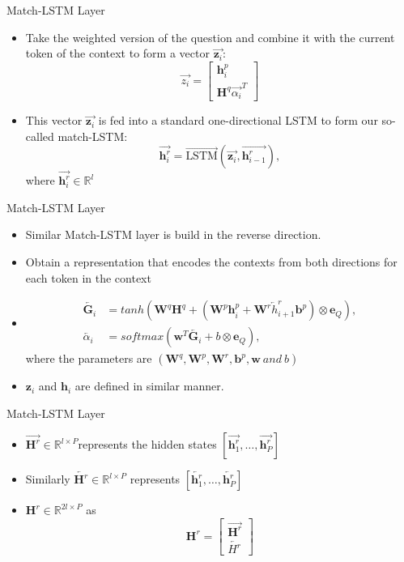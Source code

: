 \documentclass[10pt]{beamer}
\def\*#1{\mathbf{#1}}
\begin{document}
\begin{frame}{Match-LSTM Layer}
	\begin{itemize}[<+- | alert@+>]
		\item Take the weighted version of the question and combine it with the current token of the context to form a vector $\overrightarrow{\*z_i}$:
			$$\overrightarrow{z_i} =
			\begin{bmatrix}
				\*h_i^p \\ \*H^q\overrightarrow{\alpha_i}^T
			\end{bmatrix}
			$$
		\item This vector $\overrightarrow{\*z_i}$ is fed into a standard one-directional LSTM to form our so-called match-LSTM:
			$$\overrightarrow{\*h_i^r} = \overrightarrow{\text{LSTM}}(\overrightarrow{\*z_i},\overrightarrow{\*h_{i-1}^r}),$$
			where $\overrightarrow{\*h_i^r}\in \mathbb{R}^l$
	\end{itemize}
\end{frame}

\begin{frame}{Match-LSTM Layer}
	\begin{itemize}[<+- | alert@+>]
		\item Similar Match-LSTM layer is build in the reverse direction.
		\item Obtain a representation that encodes the contexts from both directions for each token in the context
		\item
			\begin{align*}
				\overleftarrow{\*G_i} &= tanh(\*W^q\*H^q + (\*W^p\*h_i^p + \*W^r\overleftarrow{h}_{i+1}^r\*b^p)\otimes \*e_Q),\\
				\overleftarrow{\alpha_i} & = softmax(\*w^T\overleftarrow{\*G_i}+b\otimes \*e_Q),
			\end{align*}
			where the parameters are $(\*W^q,\*W^p,\*W^r,\*b^p,\*w \ and \ b)$
		\item $\*z_i$ and $\*h_i$ are defined in similar manner.
	\end{itemize}
\end{frame}

\begin{frame}{Match-LSTM Layer}

	\begin{itemize}[<+- | alert@+>]
		\item $\overrightarrow{\*H^r} \in \mathbb{R}^{l\times P}$represents the hidden states $[\overrightarrow{\*h_1^r},\dots,\overrightarrow{\*h_P^r}]$
		\item Similarly $\overleftarrow{\*H^r}\in \mathbb{R}^{l\times P}$ represents $[\overleftarrow{\*h_1^r},\dots,\overleftarrow{\*h_P^r}]$
		\item $\*H^r \in \mathbb{R}^{2l \times P}$ as
			$$\*H^r = \begin{bmatrix}
				\overrightarrow{\*H^r}\\ \overleftarrow{H^r}
			\end{bmatrix}$$
	\end{itemize}

\end{frame}
\end{document}
